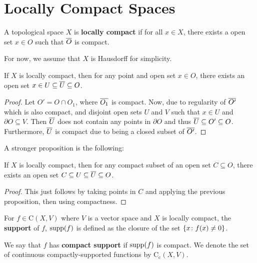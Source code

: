 \section{Locally Compact Spaces}

\begin{definition}
    A topological space $X$ is \textbf{locally compact} if for all $x \in X$, there exists a open set $x \in O$ such that $\overline O$ is compact.
\end{definition}

For now, we assume that $X$ is Hausdorff for simplicity.

\begin{proposition}
    If $X$ is locally compact, then for any point and open set $x \in O$, there exists an open set $x \in U \subseteq \overline U \subseteq O$.
\end{proposition}

\begin{proof}
    Let $O' = O \cap O_1$, where $\overline{O_1}$ is compact. Now, due to regularity of $\overline{O'}$ which is also compact, and disjoint open sets $U$ and $V$ such that $x \in U$ and $\partial O \subseteq V$. Then $\overline U$ does not contain any points in $\partial O$ and thus $\overline U \subseteq O' \subseteq O$. Furthermore, $\overline U$ is compact due to being a closed subset of $\overline{O'}$.
\end{proof}

A stronger proposition is the following:

\begin{proposition}
    If $X$ is locally compact, then for any compact subset of an open set $C \subseteq O$, there exists an open set $C \subseteq U \subseteq \overline U \subseteq O$.
\end{proposition}

\begin{proof}
    This just follows by taking points in $C$ and applying the previous proposition, then using compactness.
\end{proof}

\begin{definition}
    For $f \in \mathrm C(X, V)$ where $V$ is a vector space and $X$ is locally compact, the \textbf{support} of $f$, $\operatorname{supp}(f)$ is defined as the closure of the set $\qty{x \colon f(x) \ne 0}$.
\end{definition}

\begin{definition}
    We say that $f$ has \textbf{compact support} if $\operatorname{supp}(f)$ is compact. We denote the set of continuous compactly-supported functions by $\mathrm C_{\mathrm c}(X, V)$. 
\end{definition}

